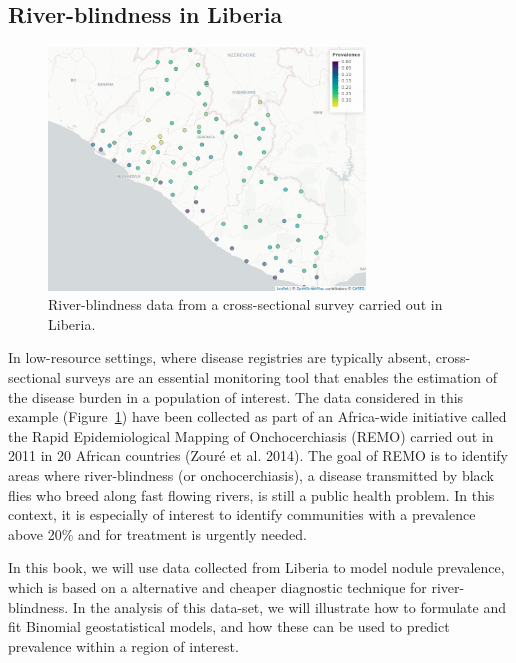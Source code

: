 \documentclass[
  letterpaper,
]{krantz}
\begin{document}
\hypertarget{sec-rb-ch1}{%
\subsection{River-blindness in Liberia}\label{sec-rb-ch1}}

\begin{figure}

{\centering \includegraphics[width=3.31in,height=\textheight]{./figures/liberia_ch1.png}

}

\caption{\label{fig-liberia-ch1}River-blindness data from a
cross-sectional survey carried out in Liberia.}

\end{figure}

In low-resource settings, where disease registries are typically absent,
cross-sectional surveys are an essential monitoring tool that enables
the estimation of the disease burden in a population of interest. The
data considered in this example (Figure~\ref{fig-liberia-ch1}) have been
collected as part of an Africa-wide initiative called the Rapid
Epidemiological Mapping of Onchocerchiasis (REMO) carried out in 2011 in
20 African countries (Zouré et al. 2014). The goal of REMO is to
identify areas where river-blindness (or onchocerchiasis), a disease
transmitted by black flies who breed along fast flowing rivers, is still
a public health problem. In this context, it is especially of interest
to identify communities with a prevalence above 20\% and for treatment
is urgently needed.

In this book, we will use data collected from Liberia to model nodule
prevalence, which is based on a alternative and cheaper diagnostic
technique for river-blindness. In the analysis of this data-set, we will
illustrate how to formulate and fit Binomial geostatistical models, and
how these can be used to predict prevalence within a region of interest.
\end{document}

